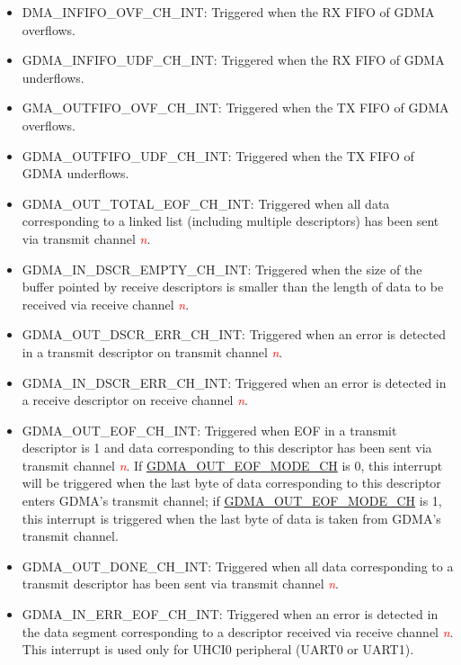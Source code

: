 \documentclass[main\_\_EN.tex]{subfiles}
\begin{document}
\begin{itemize}
\item \label{int:GDMAINFIFOOVFINT}DMA\_INFIFO\_OVF\_CH\_INT: Triggered when the RX FIFO of GDMA overflows.
\item \label{int:GDMAINFIFOUDFINT}GDMA\_INFIFO\_UDF\_CH\_INT: Triggered when the RX FIFO of GDMA underflows.
\item \label{int:GDMAOUTFIFOOVFINT}GMA\_OUTFIFO\_OVF\_CH\_INT: Triggered when the TX FIFO of GDMA overflows.
\item \label{int:GDMAOUTFIFOUDFINT}GDMA\_OUTFIFO\_UDF\_CH\_INT: Triggered when the TX FIFO of GDMA underflows.
\item \label{int:GDMAOUTTOTALEOFINT}GDMA\_OUT\_TOTAL\_EOF\_CH\_INT: Triggered when all data corresponding to a linked list (including multiple descriptors) has been sent via transmit channel \textcolor{red}{\it{n}}.
\item \label{int:GDMAINDSCREMPTYINT}GDMA\_IN\_DSCR\_EMPTY\_CH\_INT: Triggered when the size of the buffer pointed by receive descriptors is smaller than the length of data to be received via receive channel \textcolor{red}{\it{n}}.
\item \label{int:GDMAOUTDSCRERRINT}GDMA\_OUT\_DSCR\_ERR\_CH\_INT: Triggered when an error is detected in a transmit descriptor on transmit channel \textcolor{red}{\it{n}}.
\item \label{int:GDMAINDSCRERRINT}GDMA\_IN\_DSCR\_ERR\_CH\_INT: Triggered when an error is detected in a receive descriptor on receive channel \textcolor{red}{\it{n}}.
\item \label{int:GDMAOUTEOFINT}GDMA\_OUT\_EOF\_CH\_INT: Triggered when EOF in a transmit descriptor is 1 and data corresponding to this descriptor has been sent via transmit channel \textcolor{red}{\it{n}}. If \hyperref[fielddesc:GDMAOUTEOFMODECHN]{GDMA\_OUT\_EOF\_MODE\_CH} is 0, this interrupt will be triggered when the last byte of data corresponding to this descriptor enters GDMA's transmit channel; if \hyperref[fielddesc:GDMAOUTEOFMODECHN]{GDMA\_OUT\_EOF\_MODE\_CH} is 1, this interrupt is triggered when the last byte of data is taken from GDMA's transmit channel.
\item \label{int:GDMAOUTDONEINT}GDMA\_OUT\_DONE\_CH\_INT: Triggered when all data corresponding to a transmit descriptor has been sent via transmit channel \textcolor{red}{\it{n}}.
\item \label{int:GDMAINERREOFINT}GDMA\_IN\_ERR\_EOF\_CH\_INT: Triggered when an error is detected in the data segment corresponding to a descriptor received via receive channel \textcolor{red}{\it{n}}. This interrupt is used only for UHCI0 peripheral (UART0 or UART1).

\end{itemize}
\end{document}
